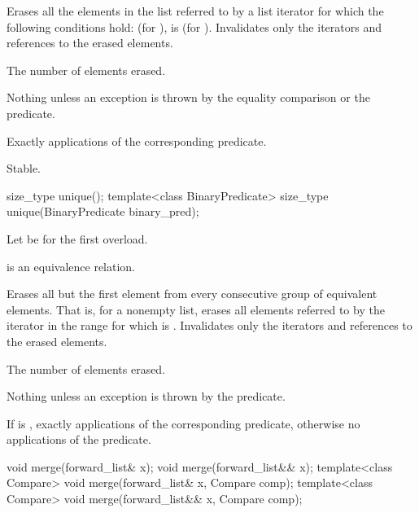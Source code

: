 \begin{itemdescr}
\pnum
\effects
Erases all the elements in the list referred to by a list iterator  for
which the following conditions hold:  (for ),
 is  (for ).
Invalidates only the iterators and references to the erased elements.

\pnum
\returns
The number of elements erased.

\pnum
\throws
Nothing unless an exception is thrown by the equality comparison or the
predicate.

\pnum
\complexity
Exactly  applications of the corresponding
predicate.

\pnum
\remarks
Stable.
\end{itemdescr}

%
\begin{itemdecl}
size_type unique();
template<class BinaryPredicate> size_type unique(BinaryPredicate binary_pred);
\end{itemdecl}

\begin{itemdescr}
\pnum
Let  be  for the first overload.

\pnum
\expects
{} is an equivalence relation.

\pnum
\effects
Erases all but the first element from every consecutive
group of equivalent elements.
That is, for a nonempty list, erases all elements referred to
by the iterator  in the range 
for which  is .
Invalidates only the iterators and references to the erased elements.

\pnum
\returns
The number of elements erased.

\pnum
\throws
Nothing unless an exception is thrown by the predicate.

\pnum
\complexity
If  is ,
exactly  applications of
the corresponding predicate,
otherwise no applications of the predicate.
\end{itemdescr}

%
\begin{itemdecl}
void merge(forward_list& x);
void merge(forward_list&& x);
template<class Compare> void merge(forward_list& x, Compare comp);
template<class Compare> void merge(forward_list&& x, Compare comp);
\end{itemdecl}

